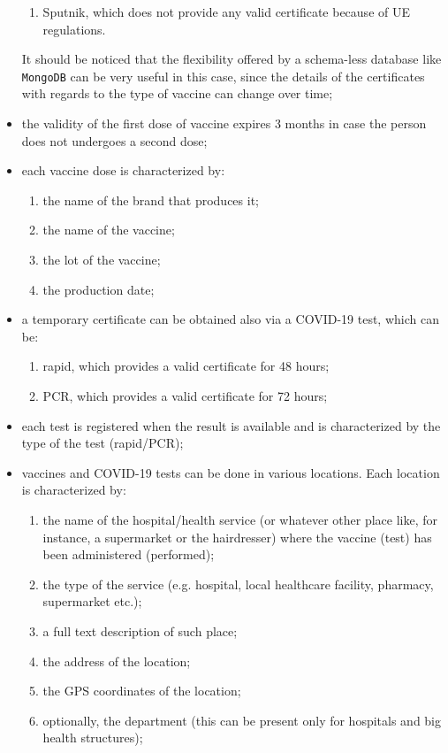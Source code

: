 \documentclass{article}
\begin{document}
\begin{itemize}
\begin{enumerate}
   \item Sputnik, which does not provide any valid certificate because of UE regulations.
\end{enumerate}
It should be noticed that the flexibility offered by a schema-less database like \verb|MongoDB| can be very useful in this case, since the details of the certificates with regards to the type of vaccine can change over time;
\item the validity of the first dose of vaccine expires 3 months in case the person does not undergoes a second dose;
\item each vaccine dose is characterized by:
\begin{enumerate}
    \item the name of the brand that produces it;
    \item the name of the vaccine;
    \item the lot of the vaccine;
    \item the production date;
\end{enumerate}
\item a temporary certificate can be obtained also via a COVID-19 test, which can be:
\begin{enumerate}
    \item rapid, which provides a valid certificate for 48 hours;
    \item PCR, which provides a valid certificate for 72 hours;
    \end{enumerate}
\item each test is registered when the result is available and is characterized by the type of the test (rapid/PCR);
\item vaccines and COVID-19 tests can be done in various locations. Each location is characterized by:
\begin{enumerate}
    \item the name of the hospital/health service (or whatever other place like, for instance, a supermarket or the hairdresser) where the vaccine (test) has been administered (performed);
    \item the type of the service (e.g. hospital, local healthcare facility, pharmacy, supermarket etc.);
    \item a full text description of such place;
    \item the address of the location;
    \item the GPS coordinates of the location;
    \item optionally, the department (this can be present only for hospitals and big health structures);

\end{enumerate}
\end{itemize}
\end{document}

